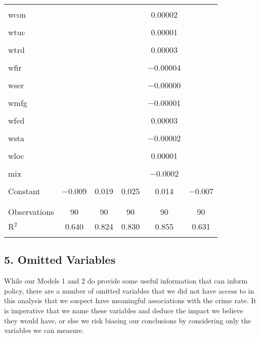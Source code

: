 \documentclass[]{article}
\begin{document}
\begin{table}[!htbp]
\begin{tabular}{@{\extracolsep{5pt}}lccccc}
  & & & & & \\ 
 wcon &  &  &  & 0.00002 &  \\ 
  & & & & & \\ 
 wtuc &  &  &  & 0.00001 &  \\ 
  & & & & & \\ 
 wtrd &  &  &  & 0.00003 &  \\ 
  & & & & & \\ 
 wfir &  &  &  & $-$0.00004 &  \\ 
  & & & & & \\ 
 wser &  &  &  & $-$0.00000 &  \\ 
  & & & & & \\ 
 wmfg &  &  &  & $-$0.00001 &  \\ 
  & & & & & \\ 
 wfed &  &  &  & 0.00003 &  \\ 
  & & & & & \\ 
 wsta &  &  &  & $-$0.00002 &  \\ 
  & & & & & \\ 
 wloc &  &  &  & 0.00001 &  \\ 
  & & & & & \\ 
 mix &  &  &  & $-$0.0002 &  \\ 
  & & & & & \\ 
 Constant & $-$0.009 & 0.019 & 0.025 & 0.014 & $-$0.007 \\ 
  & & & & & \\ 
\hline \\[-1.8ex] 
Observations & 90 & 90 & 90 & 90 & 90 \\ 
R$^{2}$ & 0.640 & 0.824 & 0.830 & 0.855 & 0.631 \\ 
\hline 
\hline \\[-1.8ex] 
\end{tabular} 
\end{table}

\subsection{5. Omitted Variables}\label{omitted-variables}

While our Models 1 and 2 do provide some useful information that can
inform policy, there are a number of omitted variables that we did not
have access to in this analysis that we suspect have meaningful
associations with the crime rate. It is imperative that we name these
variables and deduce the impact we believe they would have, or else we
risk biasing our conclusions by considering only the variables we can
measure.
\end{document}

